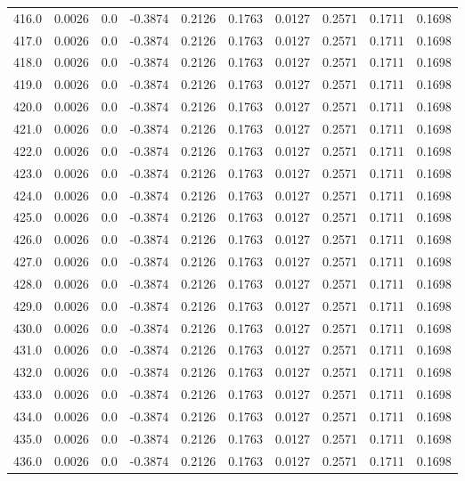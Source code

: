 \begin{longtable}{lrrrrrrrrr}
416.0 & 0.0026 & 0.0 & -0.3874 & 0.2126 & 0.1763 & 0.0127 & 0.2571 & 0.1711 & 0.1698 \\
417.0 & 0.0026 & 0.0 & -0.3874 & 0.2126 & 0.1763 & 0.0127 & 0.2571 & 0.1711 & 0.1698 \\
418.0 & 0.0026 & 0.0 & -0.3874 & 0.2126 & 0.1763 & 0.0127 & 0.2571 & 0.1711 & 0.1698 \\
419.0 & 0.0026 & 0.0 & -0.3874 & 0.2126 & 0.1763 & 0.0127 & 0.2571 & 0.1711 & 0.1698 \\
420.0 & 0.0026 & 0.0 & -0.3874 & 0.2126 & 0.1763 & 0.0127 & 0.2571 & 0.1711 & 0.1698 \\
421.0 & 0.0026 & 0.0 & -0.3874 & 0.2126 & 0.1763 & 0.0127 & 0.2571 & 0.1711 & 0.1698 \\
422.0 & 0.0026 & 0.0 & -0.3874 & 0.2126 & 0.1763 & 0.0127 & 0.2571 & 0.1711 & 0.1698 \\
423.0 & 0.0026 & 0.0 & -0.3874 & 0.2126 & 0.1763 & 0.0127 & 0.2571 & 0.1711 & 0.1698 \\
424.0 & 0.0026 & 0.0 & -0.3874 & 0.2126 & 0.1763 & 0.0127 & 0.2571 & 0.1711 & 0.1698 \\
425.0 & 0.0026 & 0.0 & -0.3874 & 0.2126 & 0.1763 & 0.0127 & 0.2571 & 0.1711 & 0.1698 \\
426.0 & 0.0026 & 0.0 & -0.3874 & 0.2126 & 0.1763 & 0.0127 & 0.2571 & 0.1711 & 0.1698 \\
427.0 & 0.0026 & 0.0 & -0.3874 & 0.2126 & 0.1763 & 0.0127 & 0.2571 & 0.1711 & 0.1698 \\
428.0 & 0.0026 & 0.0 & -0.3874 & 0.2126 & 0.1763 & 0.0127 & 0.2571 & 0.1711 & 0.1698 \\
429.0 & 0.0026 & 0.0 & -0.3874 & 0.2126 & 0.1763 & 0.0127 & 0.2571 & 0.1711 & 0.1698 \\
430.0 & 0.0026 & 0.0 & -0.3874 & 0.2126 & 0.1763 & 0.0127 & 0.2571 & 0.1711 & 0.1698 \\
431.0 & 0.0026 & 0.0 & -0.3874 & 0.2126 & 0.1763 & 0.0127 & 0.2571 & 0.1711 & 0.1698 \\
432.0 & 0.0026 & 0.0 & -0.3874 & 0.2126 & 0.1763 & 0.0127 & 0.2571 & 0.1711 & 0.1698 \\
433.0 & 0.0026 & 0.0 & -0.3874 & 0.2126 & 0.1763 & 0.0127 & 0.2571 & 0.1711 & 0.1698 \\
434.0 & 0.0026 & 0.0 & -0.3874 & 0.2126 & 0.1763 & 0.0127 & 0.2571 & 0.1711 & 0.1698 \\
435.0 & 0.0026 & 0.0 & -0.3874 & 0.2126 & 0.1763 & 0.0127 & 0.2571 & 0.1711 & 0.1698 \\
436.0 & 0.0026 & 0.0 & -0.3874 & 0.2126 & 0.1763 & 0.0127 & 0.2571 & 0.1711 & 0.1698 \\

\end{longtable}

